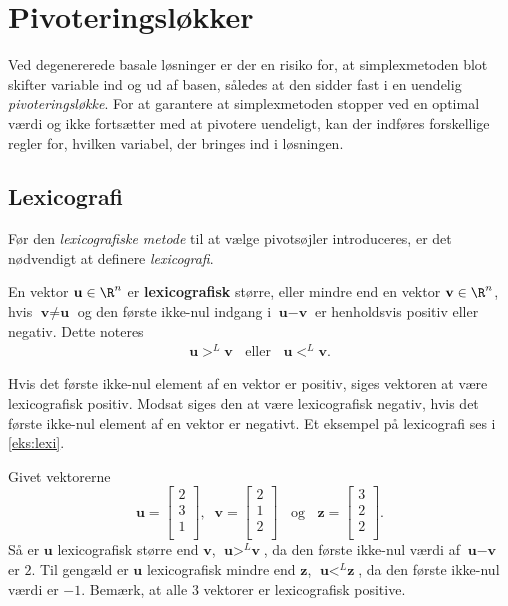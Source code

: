 \section{Pivoteringsløkker}
Ved degenererede basale løsninger er der en risiko for, at simplexmetoden blot skifter variable ind og ud af basen, således at den sidder fast i en uendelig \textit{pivoteringsløkke}.  
For at garantere at simplexmetoden stopper ved en optimal værdi og ikke fortsætter med at pivotere uendeligt, kan der indføres forskellige regler for, hvilken variabel, der bringes ind i løsningen.

\subsection{Lexicografi}
%
Før den \textit{lexicografiske metode} til at vælge pivotsøjler introduceres, er det nødvendigt at definere \textit{lexicografi}.
\begin{defn}{}{}
En vektor $\textbf{u}\in \R^n$ er \textbf{lexicografisk} større, eller mindre end en vektor $\textbf{v}\in \R^n$, hvis $\textbf{v} \neq \textbf{u}$ og den første ikke-nul indgang i $\textbf{u}-\textbf{v}$ er henholdsvis positiv eller negativ. Dette noteres
\begin{align*}
\textbf{u} >^L \textbf{v} \phantom{..} \text{ eller }\phantom{..} \textbf{u} <^L \textbf{v}.
\end{align*} 
\end{defn}
\noindent
Hvis det første ikke-nul element af en vektor er positiv, siges vektoren at være lexicografisk positiv. Modsat siges den at være lexicografisk negativ, hvis det første ikke-nul element af en vektor er negativt. Et eksempel på lexicografi ses i \ref{eks:lexi}.
\\
%
\begin{eks}\label{eks:lexi}
Givet vektorerne
$$\textbf{u}=
\begin{bmatrix}
2\\
3\\
1\\
\end{bmatrix}
,\phantom{..}
\textbf{v}=
\begin{bmatrix}
2\\
1\\
2\\
\end{bmatrix}
\phantom{..}\text{ og }\phantom{..}
\textbf{z}=
\begin{bmatrix}
3\\
2\\
2\\
\end{bmatrix}
.$$
Så er $\textbf{u}$  lexicografisk større end $\textbf{v}$, $\textbf{u} >^L \textbf{v}$, da den første ikke-nul værdi af $\textbf{u}-\textbf{v}$ er $2$.
Til gengæld er $\textbf{u}$ lexicografisk mindre end $\textbf{z}$, $\textbf{u} <^L \textbf{z}$, da den første ikke-nul værdi er $-1$.
Bemærk, at alle $3$ vektorer er lexicografisk positive.
\end{eks}
